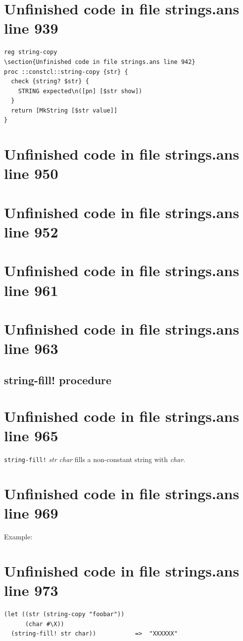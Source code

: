 \documentclass[twoside,9pt]{report}
\begin{document}
\section{Unfinished code in file strings.ans line 939}
\begin{lstlisting}
reg string-copy
\section{Unfinished code in file strings.ans line 942}
proc ::constcl::string-copy {str} {
  check {string? $str} {
    STRING expected\n([pn] [$str show])
  }
  return [MkString [$str value]]
}
\end{lstlisting}
\section{Unfinished code in file strings.ans line 950}
\section{Unfinished code in file strings.ans line 952}
\section{Unfinished code in file strings.ans line 961}
\section{Unfinished code in file strings.ans line 963}
\subsection{string-fill! procedure}
\label{string-fill"!-procedure}
\section{Unfinished code in file strings.ans line 965}


\texttt{string-fill!} \emph{str} \emph{char} fills a non-constant string with \emph{char}.

\section{Unfinished code in file strings.ans line 969}


Example:

\section{Unfinished code in file strings.ans line 973}
\begin{verbatim}
(let ((str (string-copy "foobar"))
      (char #\X))
  (string-fill! str char))           =>  "XXXXXX"
\end{verbatim}
\end{document}
